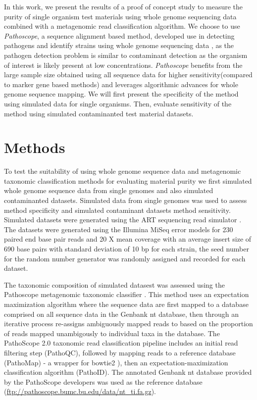 \documentclass[fleqn,10pt,lineno]{wlpeerj}\usepackage[]{graphicx}\usepackage[]{color}
\begin{document}
In this work, we present the results of a proof of concept study to measure the purity of single organism test materials using whole genome sequencing data combined with a metagenomic read classification algorithm. 
We choose to use \textit{Pathoscope}, a sequence alignment based method, 
developed use in detecting pathogens and identify strains using whole genome sequencing data \citep{Francis2013}, 
as the pathogen detection problem is similar to contaminant detection as the organism of interest is likely present at low concentrations. 
\textit{Pathoscope} benefits from the large sample size obtained using all sequence data for higher sensitivity(compared to marker gene based methods) and leverages algorithmic advances for whole genome sequence mapping. 
We will first present the specificity of the method using simulated data for single organisms. 
Then, evaluate sensitivity of the method using simulated contaminanted test material datasets.  


\section*{Methods}
To test the suitability of using whole genome sequence data and metagenomic taxonomic classification methods for evaluating material purity we first simulated whole genome sequence data from single genomes and also simulated contaminanted datasets. 
Simulated data from single genomes was used to assess method specificity and simulated contaminant datasets method sensitivity. Simulated datasets were generated using the ART sequencing read simulator \citep{Huang2012}. 
The datasets were generated using the Illumina MiSeq error models for 230 paired end base pair reads and 20 X mean coverage with an average insert size of 690 base pairs with standard deviation of 10 bp for each strain, 
the seed number for the random number generator was randomly assigned and recorded for each dataset. 

The taxonomic composition of simulated datasest was assessed using the Pathoscope metagenomic taxonomic classifier \citep{Francis2013}. 
This method uses an expectation maximization algorithm where the sequence data are first mapped to a database comprised on all sequence data in the Genbank nt database, 
then through an iterative process re-assigns ambiguously mapped reads to based on the proportion of reads mapped unambigously to individual taxa in the database. 
The PathoScope 2.0 taxonomic read classification pipeline includes an initial read filtering step (PathoQC), 
followed by mapping reads to a reference database (PathoMap) - a wrapper for bowtie2 \citep{Langmead2012}), then an expectation-maximization classification algorithm (PathoID). 
The annotated Genbank nt database provided by the PathoScope developers was used as the reference database (\url{ftp://pathoscope.bumc.bu.edu/data/nt\_ti.fa.gz}).
\end{document}
